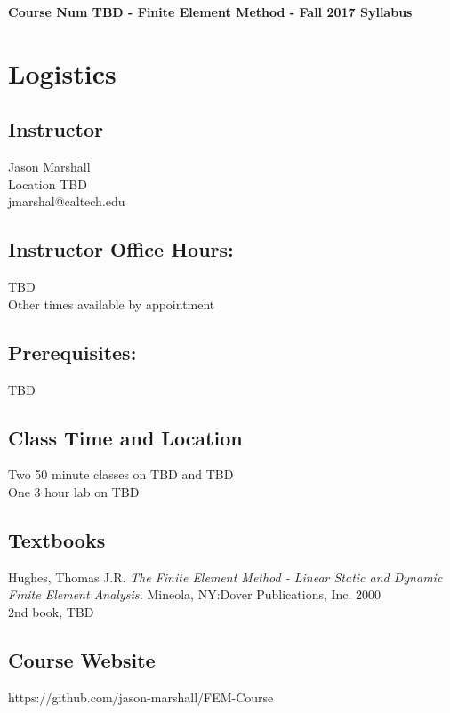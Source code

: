 \documentclass[12pt,letterpaper]{article}
\begin{document}
\sectionfont{\large}
\subsectionfont{\normalsize}

\begin{center}
 {\Large \bf Course Num TBD - Finite Element Method - Fall 2017
  \newline 
  \newline Syllabus}
\end{center}

\section{Logistics}
\begin{minipage}[t]{0.5\textwidth}
\subsection*{Instructor}
Jason Marshall\\
Location TBD\\
jmarshal@caltech.edu

\subsection*{Instructor Office Hours:}
TBD\\
Other times available by appointment

\subsection*{Prerequisites:}
TBD\\
\end{minipage}
\begin{minipage}[t]{0.5\textwidth}
\subsection*{Class Time and Location}
Two 50 minute classes on TBD and TBD\\
One 3 hour lab on TBD
\subsection*{Textbooks}
Hughes, Thomas J.R. \emph{The Finite Element Method - Linear Static and Dynamic Finite Element Analysis.} Mineola, NY:Dover Publications, Inc. 2000 \\
2nd book, TBD
\end{minipage}

\subsection*{Course Website}
https://github.com/jason-marshall/FEM-Course
\end{document}
